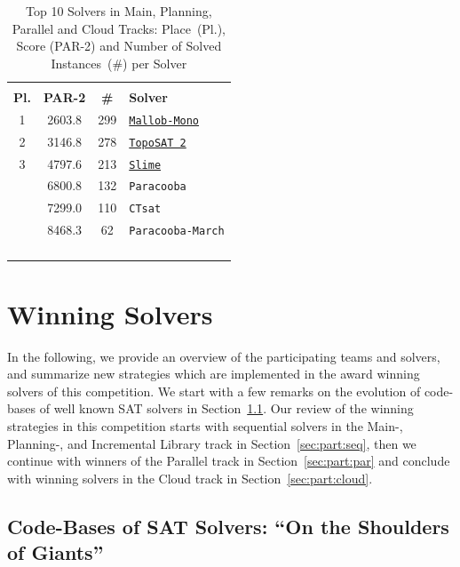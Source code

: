 \documentclass{elsarticle}
\newcommand{\solver}[1]{\texttt{#1}}
\newcommand{\solbert}[1]{\underline{\solver{#1}}}
\begin{document}
\begin{table}
\begin{tabularx}{.5\linewidth}{cccX}
\arrayrulecolor{lightgray}
\multicolumn{4}{l}{\bf Cloud Track}\\
\bf Pl. & \bf PAR-2 & \bf \# & \bf Solver \\
\hline
 1 & 2603.8 & 299 & \solbert{Mallob-Mono} \\
 2 & 3146.8 & 278 & \solbert{TopoSAT 2} \\
 3 & 4797.6 & 213 & \solbert{Slime} \\
   & 6800.8 & 132 & \solver{Paracooba} \\
   & 7299.0 & 110 & \solver{CTsat} \\
   & 8468.3 & \phantom{0}62 & \solver{Paracooba-March} \\
\phantom{0} & \phantom{0} & \phantom{0} & \phantom{0}\\
\phantom{0} & \phantom{0} & \phantom{0} & \phantom{0}\\
\phantom{0} & \phantom{0} & \phantom{0} & \phantom{0}\\
\phantom{0} & \phantom{0} & \phantom{0} & \phantom{0}
\end{tabularx}
\caption{Top 10 Solvers in Main, Planning, Parallel and Cloud Tracks: Place~(Pl.), Score (PAR-2) and Number of Solved Instances~(\#) per Solver}
\label{tab:results}
\end{table}


\section{Winning Solvers}
\label{sec:winners}

In the following, we provide an overview of the participating teams and solvers, 
and summarize new strategies which are implemented in the award winning solvers of this competition. 
We start with a few remarks on the evolution of code-bases of well known SAT solvers in Section~\ref{sec:codebases}. 
Our review of the winning strategies in this competition starts with sequential solvers in the Main-, Planning-, and Incremental Library track in Section~\ref{sec:part:seq}, then we continue with winners of the Parallel track in Section~\ref{sec:part:par} and conclude with winning solvers in the Cloud track in Section~\ref{sec:part:cloud}. 


\subsection{Code-Bases of SAT Solvers: ``On the Shoulders of Giants''}
\label{sec:codebases}
\end{document}
